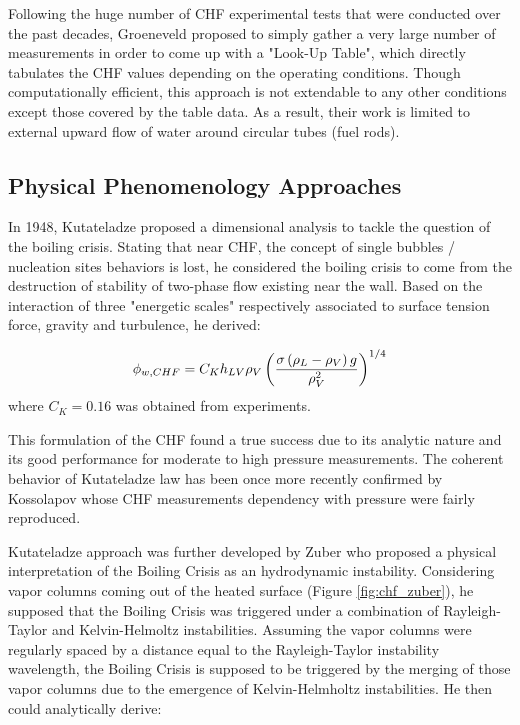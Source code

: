 \npar

Following the huge number of CHF experimental tests that were conducted over the past decades, Groeneveld \etal \cite{groeneveld_2006_2007} proposed to simply gather a very large number of measurements in order to come up with a "Look-Up Table", which directly tabulates the CHF values depending on the operating conditions. Though computationally efficient, this approach is not extendable to any other conditions except those covered by the table data. As a result, their work is limited to external upward flow of water around circular tubes (\eg fuel rods).  


\subsection{Physical Phenomenology Approaches}


In 1948, Kutateladze \cite{kutateladze_transition_1948} proposed a dimensional analysis to tackle the question of the boiling crisis. Stating that near CHF, the concept of single bubbles / nucleation sites behaviors is lost, he considered the boiling crisis to come from the destruction of stability of two-phase flow existing near the wall. Based on the interaction of three "energetic scales" respectively associated to surface tension force, gravity and turbulence, he derived:

\begin{equation}
\phi_{w,CHF} = C_{K} h_{LV} \rho_{V} \left( \frac{\sigma \left( \rho_{L} - \rho_{V} \right)g}{\rho_{V}^{2}} \right)^{1/4}
\label{eq:chf_kutateladze}
\end{equation} 
where $C_{K}=0.16$ was obtained from experiments.

\npar

This formulation of the CHF found a true success due to its analytic nature and its good performance for moderate to high pressure measurements. The coherent behavior of Kutateladze law has been once more recently confirmed by Kossolapov \cite{kossolapov_experimental_2021} whose CHF measurements dependency with pressure were fairly reproduced.

\npar

Kutateladze approach was further developed by Zuber \cite{zuber_hydrodynamic_1959} who proposed a physical interpretation of the  Boiling Crisis as an hydrodynamic instability. Considering vapor columns coming out of the heated surface (Figure \ref{fig:chf_zuber}), he supposed that the Boiling Crisis was triggered under a combination of Rayleigh-Taylor and Kelvin-Helmoltz instabilities. Assuming the vapor columns were regularly spaced by a distance equal to the Rayleigh-Taylor instability wavelength, the Boiling Crisis is supposed to be triggered by the merging of those vapor columns due to the emergence of Kelvin-Helmholtz instabilities. He then could analytically derive:

